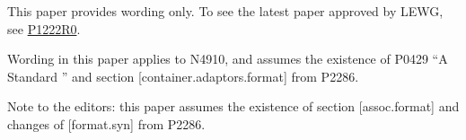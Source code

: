 
% 

This paper provides wording only.  To see the latest paper approved by LEWG,
see \href{https://www.open-std.org/jtc1/sc22/wg21/docs/papers/2018/p1222r0.pdf}{P1222R0}.

Wording in this paper applies to N4910, and assumes the existence of P0429 ``A
Standard '' and section [container.adaptors.format] from
P2286.

Note to the editors: this paper assumes the existence of section
[assoc.format] and changes of [format.syn] from P2286.

\markboth{\contentsname}{}

\makeatletter
\renewcommand\@pnumwidth{2.5em}
\makeatother

\tableofcontents
\setcounter{tocdepth}{5}

%
